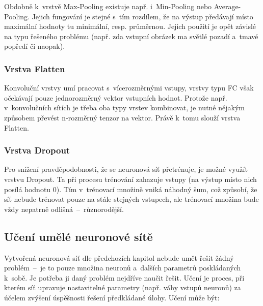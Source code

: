 \documentclass[a4paper,12pt]{article}
\begin{document}
{{{{{{{Obdobně k~vrstvě Max-Pooling existuje např. i~Min-Pooling nebo Average-Pooling. Jejich fungování je stejné s~tím rozdílem, že na výstup předávají místo maximální hodnoty tu minimální, resp. průměrnou. Jejich použití je opět závislé na typu řešeného problému (např. zda vstupní obrázek ma světlé pozadí a~tmavé popředí či naopak).~\cite{keras}

\subsubsection{Vrstva Flatten}

Konvoluční vrstvy umí pracovat s~vícerozměrnými vstupy, vrstvy typu FC však očekávají pouze jednorozměrný vektor vstupních hodnot. Protože např. v~konvolučních sítích je třeba oba typy vrstev kombinovat, je nutné nějakým způsobem převést n-rozměrný tenzor na vektor. Právě k~tomu slouží vrstva Flatten.~\cite{keras}

\drawgimp

\subsubsection{Vrstva Dropout}

Pro snížení pravděpodobnosti, že se neuronová síť přetrénuje, je možné využít vrstvu Dropout. Ta při procesu trénování zahazuje vstupy (na výstup místo nich posílá hodnotu 0). Tím v~trénovací množině vniká náhodný šum, což způsobí, že síť nebude trénovat pouze na stále stejných vstupech, ale trénovací množina bude vždy nepatrně odlišná~--~různorodější.~\cite{keras}


{

\subsection{Učení umělé neuronové sítě}

Vytvořená neuronová síť dle předchozích kapitol nebude umět řešit žádný problém~--~je to pouze množina neuronů a~dalších parametrů poskládaných k~sobě. Je potřeba ji daný problém nejdříve naučit řešit. Učení je proces, při kterém síť upravuje nastavitelné parametry (např. váhy vstupů neuronů) za účelem zvýšení úspěšnosti řešení předkládané úlohy. Učení může být:


}}}}}}}}
\end{document}
